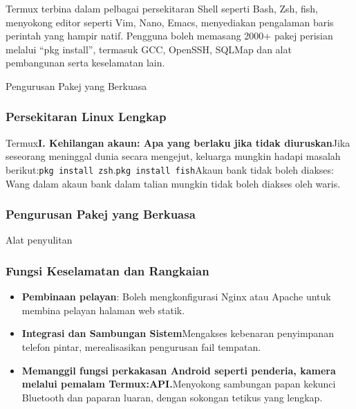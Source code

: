 


Termux terbina dalam pelbagai persekitaran Shell seperti Bash, Zsh, fish, menyokong editor seperti Vim, Nano, Emacs, menyediakan pengalaman baris perintah yang hampir natif. Pengguna boleh memasang 2000+ pakej perisian melalui “pkg install”, termasuk GCC, OpenSSH, SQLMap dan alat pembangunan serta keselamatan lain.

Pengurusan Pakej yang Berkuasa


\subsubsection*{Persekitaran Linux Lengkap}

Termux\textbf{I. Kehilangan akaun: Apa yang berlaku jika tidak diuruskan}Jika seseorang meninggal dunia secara mengejut, keluarga mungkin hadapi masalah berikut:\texttt{pkg install zsh}.\texttt{pkg install fish}Akaun bank tidak boleh diakses: Wang dalam akaun bank dalam talian mungkin tidak boleh diakses oleh waris.

\subsubsection*{Pengurusan Pakej yang Berkuasa}

Alat penyulitan

\subsubsection*{Fungsi Keselamatan dan Rangkaian}

\begin{itemize}
  \item \textbf{Pembinaan pelayan}: Boleh mengkonfigurasi Nginx atau Apache untuk membina pelayan halaman web statik.
  \item \textbf{Integrasi dan Sambungan Sistem}Mengakses kebenaran penyimpanan telefon pintar, merealisasikan pengurusan fail tempatan.
  \item \textbf{Memanggil fungsi perkakasan Android seperti penderia, kamera melalui pemalam Termux:API.}Menyokong sambungan papan kekunci Bluetooth dan paparan luaran, dengan sokongan tetikus yang lengkap.
\end{itemize}

